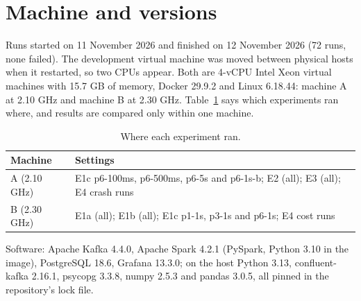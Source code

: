 \section{Machine and versions}
\label{app:machine}
Runs started on 11 November 2026 and finished on 12 November 2026 (72 runs, none failed). The development
virtual machine was moved between physical hosts when it restarted, so two CPUs appear. Both are 4-vCPU Intel
Xeon virtual machines with 15.7 GB of memory, Docker 29.9.2 and Linux 6.18.44: machine A at 2.10 GHz and
machine B at 2.30 GHz. Table~\ref{tab:machines} says which experiments ran where, and results are compared
only within one machine.

\begin{table}[H]
\centering\small
\caption{Where each experiment ran.}
\label{tab:machines}
\begin{tabular}{@{}ll@{}}
\toprule
Machine & Settings \\
\midrule
A (2.10 GHz) & E1c p6-100ms, p6-500ms, p6-5s and p6-1s-b; E2 (all); E3 (all); E4 crash runs \\
B (2.30 GHz) & E1a (all); E1b (all); E1c p1-1s, p3-1s and p6-1s; E4 cost runs \\
\bottomrule
\end{tabular}
\end{table}

\noindent Software: Apache Kafka 4.4.0, Apache Spark 4.2.1 (PySpark, Python 3.10 in the image), PostgreSQL
18.6, Grafana 13.3.0; on the host Python 3.13, confluent-kafka 2.16.1, psycopg 3.3.8, numpy 2.5.3 and
pandas 3.0.5, all pinned in the repository's lock file.
